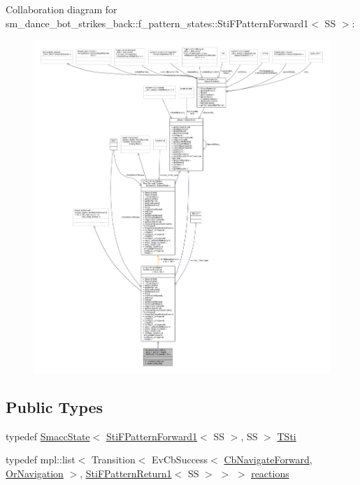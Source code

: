 Collaboration diagram for sm\+\_\+dance\+\_\+bot\+\_\+strikes\+\_\+back\+:\+:f\+\_\+pattern\+\_\+states\+:\+:Sti\+F\+Pattern\+Forward1$<$ SS $>$\+:
\nopagebreak
\begin{figure}[H]
\begin{center}
\leavevmode
\includegraphics[width=350pt]{structsm__dance__bot__strikes__back_1_1f__pattern__states_1_1StiFPatternForward1__coll__graph}
\end{center}
\end{figure}
\subsection*{Public Types}
\begin{DoxyCompactItemize}
\item 
typedef \hyperlink{classSmaccState}{Smacc\+State}$<$ \hyperlink{structsm__dance__bot__strikes__back_1_1f__pattern__states_1_1StiFPatternForward1}{Sti\+F\+Pattern\+Forward1}$<$ SS $>$, SS $>$ \hyperlink{structsm__dance__bot__strikes__back_1_1f__pattern__states_1_1StiFPatternForward1_a30d04bd6c724d937fdbb5ca3f1ee3bbd}{T\+Sti}
\item 
typedef mpl\+::list$<$ Transition$<$ Ev\+Cb\+Success$<$ \hyperlink{classcl__move__base__z_1_1CbNavigateForward}{Cb\+Navigate\+Forward}, \hyperlink{classsm__dance__bot__strikes__back_1_1OrNavigation}{Or\+Navigation} $>$, \hyperlink{structsm__dance__bot__strikes__back_1_1f__pattern__states_1_1StiFPatternReturn1}{Sti\+F\+Pattern\+Return1}$<$ SS $>$ $>$ $>$ \hyperlink{structsm__dance__bot__strikes__back_1_1f__pattern__states_1_1StiFPatternForward1_a15622eba77548660934a40ec88591a4f}{reactions}
\end{DoxyCompactItemize}
